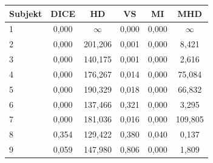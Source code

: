 \begin{tabular}{l c c c c c}
 \hline
Subjekt & DICE & HD & VS & MI & MHD \\ \hline
1 & 0,000 & $\infty$ & 0,000 & 0,000 & $\infty$ \\
2 & 0,000 & 201,206 & 0,001 & 0,000 & 8,421 \\
3 & 0,000 & 140,175 & 0,001 & 0,000 & 2,616 \\
4 & 0,000 & 176,267 & 0,014 & 0,000 & 75,084 \\
5 & 0,000 & 190,329 & 0,018 & 0,000 & 66,832 \\
6 & 0,000 & 137,466 & 0,321 & 0,000 & 3,295 \\
7 & 0,000 & 181,036 & 0,016 & 0,000 & 109,805 \\
8 & 0,354 & 129,422 & 0,380 & 0,040 & 0,137 \\
9 & 0,059 & 147,980 & 0,806 & 0,000 & 1,809 \\
\hline 
 \end{tabular}
